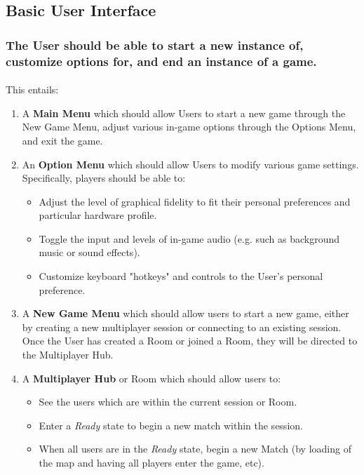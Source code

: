 \documentclass{article}
\begin{document}
\subsection{Basic User Interface}
\subsubsection{\textbf{The User should be able to start a new instance of, customize options for, and end an instance of a game.}}
\paragraph{}This entails:

\begin{enumerate}
  \item A \textbf{Main Menu} which should allow Users to start a new game through the New Game Menu, adjust various in-game options through the Options Menu, and exit the game.
  \item An \textbf{Option Menu} which should allow Users to modify various game settings. Specifically, players should be able to:
  
  \begin{itemize}
      \item Adjust the level of graphical fidelity to fit their personal preferences and particular hardware profile.
      \item Toggle the input and levels of in-game audio (e.g. such as background music or sound effects).
      \item Customize keyboard "hotkeys" and controls to the User's personal preference. 
  \end{itemize}
  
 \item A \textbf{New Game Menu} which should allow users to start a new game, either by creating a new multiplayer session or connecting to an existing session. Once the User has created a Room or joined a Room, they will be directed to the Multiplayer Hub.
 \item A \textbf{Multiplayer Hub} or Room which should allow users to:
 
  \begin{itemize}
      \item See the users which are within the current session or Room.
      \item Enter a \textit{Ready} state to begin a new match within the session.
      \item When all users are in the \textit{Ready} state, begin a new Match (by loading of the map and having all players enter the game, etc).
  \end{itemize}
  

\end{enumerate}
\end{document}

